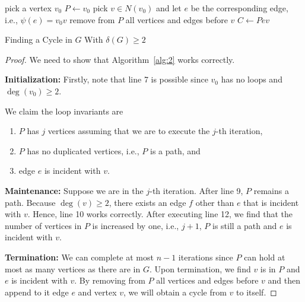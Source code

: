 \documentclass[thmcnt=section, 12pt, color=cyan]{my-elegantbook}
\begin{document}
\begin{algorithm}[ht]
    pick a vertex $v_0$ \; 
    $P \gets v_0$ \;
    pick $v \in N(v_0)$ and let $e$ be the corresponding edge, i.e., $\psi(e) = v_0 v$ \;
    remove from $P$ all vertices and edges before $v$ \;
    $C \gets P e v$ \;
    \caption{Finding a Cycle in $G$ With $\delta(G) \geq 2$}
    \label{alg:2}
\end{algorithm}

\begin{proof}
We need to show that Algorithm~\ref{alg:2} works correctly. 
    
\noindent \textbf{Initialization:} Firstly, note that line 7 is possible 
since $v_0$ has no loops and $\deg(v_0) \geq 2$. 

We claim the loop invariants are
\begin{enumerate}
    \item $P$ has $j$ vertices assuming that 
		we are to execute the $j$-th iteration,
    \item $P$ has no duplicated vertices, i.e., $P$ is a path, and
    \item edge $e$ is incident with $v$.
\end{enumerate}

\noindent \textbf{Maintenance:} Suppose we are in the $j$-th iteration. 
After line 9, $P$ remains a path. Because $\deg(v) \geq 2$, 
there exists an edge $f$ other than $e$ that is incident with $v$. 
Hence, line 10 works correctly. 
After executing line 12, we find that the number of vertices in $P$ is increased by one, i.e., $j+1$, 
$P$ is still a path and $e$ is incident with $v$.

\noindent \textbf{Termination:} We can complete at most $n-1$ iterations 
since $P$ can hold at most as many vertices as there are in $G$. 
Upon termination, 
we find $v$ is in $P$ and $e$ is incident with $v$. 
By removing from $P$ all vertices and edges before $v$ 
and then append to it edge $e$ and vertex $v$, 
we will obtain a cycle from $v$ to itself. 
\end{proof}

\end{document}
